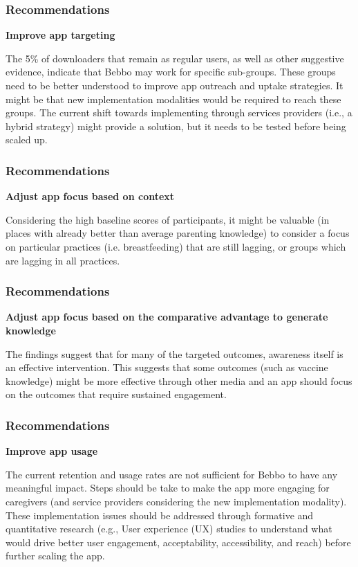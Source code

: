 \documentclass[aspectratio=169]{beamer}
\begin{document}
\begin{frame}
   \frametitle{Recommendations}

\textbf{Improve app targeting}

The 5\% of downloaders that remain as regular users, as well as other suggestive evidence, indicate that Bebbo may work for specific sub-groups. These groups need to be better understood to improve app outreach and uptake strategies. It might be that new implementation modalities would be required to reach these groups. The current shift towards implementing through services providers (i.e., a hybrid strategy) might provide a solution, but it needs to be tested before being scaled up.  

\end{frame}

\begin{frame}
   \frametitle{Recommendations}

\textbf{Adjust app focus based on context}

Considering the high baseline scores of participants, it might be valuable (in places with already better than average parenting knowledge) to consider a focus on particular practices (i.e. breastfeeding) that are still lagging, or groups which are lagging in all practices. 
\end{frame}

\begin{frame}
   \frametitle{Recommendations}
 

\textbf{Adjust app focus based on the comparative advantage to generate knowledge}

The findings suggest that  for many of the targeted outcomes, awareness itself is an effective intervention. This suggests that some outcomes (such as vaccine knowledge) might be more effective through other media and an app should focus on the outcomes that require sustained engagement. 
\end{frame}

\begin{frame}
     \frametitle{Recommendations}
\textbf{Improve app usage}

The current retention and usage rates are not sufficient for Bebbo to have any meaningful impact. Steps should be take to make the app more engaging for caregivers (and service providers considering the new implementation modality). These implementation issues should be addressed through formative and quantitative research  (e.g., User experience (UX) studies to understand what would drive better user engagement, acceptability, accessibility, and reach) before further scaling the app.  

\end{frame}
\end{document}
